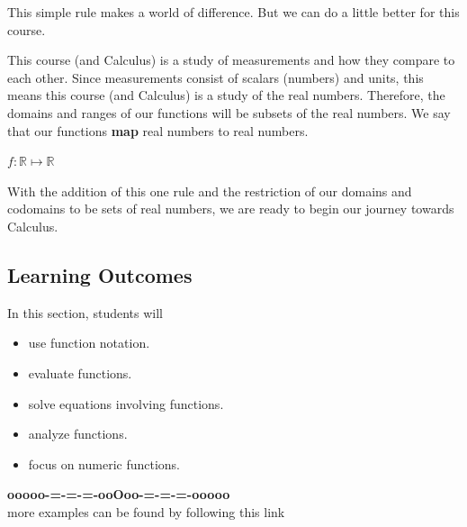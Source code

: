 \documentclass{ximera}
\begin{document}
This simple rule makes a world of difference. But we can do a little better for this course. 




This course (and Calculus) is a study of measurements and how they compare to each other. Since measurements consist of scalars (numbers) and units, this means this course (and Calculus) is a study of the real numbers.  Therefore, the domains and ranges of our functions will be subsets of the real numbers.  We say that our functions \textbf{map} real numbers to real numbers.


\begin{center}
\textbf{\textcolor{blue!55!black}{$f : \mathbb{R} \mapsto \mathbb{R}$}} 
\end{center}





With the addition of this one rule and the restriction of our domains and codomains to be sets of real numbers, we are ready to begin our journey towards Calculus.








\subsection*{Learning Outcomes}
\hfill\break

\begin{sectionOutcomes}
In this section, students will 

\begin{itemize}
\item use function notation.
\item evaluate functions.
\item solve equations involving functions.
\item analyze functions.
\item focus on numeric functions.
\end{itemize}
\end{sectionOutcomes}













\begin{onlineOnly}
\begin{center}
\textbf{\textcolor{green!50!black}{ooooo-=-=-=-ooOoo-=-=-=-ooooo}} \\

more examples can be found by following this link\\ 

\end{center}
\end{onlineOnly}
\end{document}
